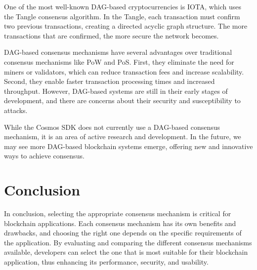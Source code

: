 One of the most well-known DAG-based cryptocurrencies is IOTA, which uses the Tangle consensus algorithm. In the Tangle, each transaction must confirm two previous transactions, creating a directed acyclic graph structure. The more transactions that are confirmed, the more secure the network becomes.

DAG-based consensus mechanisms have several advantages over traditional consensus mechanisms like PoW and PoS. First, they eliminate the need for miners or validators, which can reduce transaction fees and increase scalability. Second, they enable faster transaction processing times and increased throughput. However, DAG-based systems are still in their early stages of development, and there are concerns about their security and susceptibility to attacks.

While the Cosmos SDK does not currently use a DAG-based consensus mechanism, it is an area of active research and development. In the future, we may see more DAG-based blockchain systems emerge, offering new and innovative ways to achieve consensus.

\section{Conclusion}

In conclusion, selecting the appropriate consensus mechanism is critical for blockchain applications. Each consensus mechanism has its own benefits and drawbacks, and choosing the right one depends on the specific requirements of the application. By evaluating and comparing the different consensus mechanisms available, developers can select the one that is most suitable for their blockchain application, thus enhancing its performance, security, and usability.
